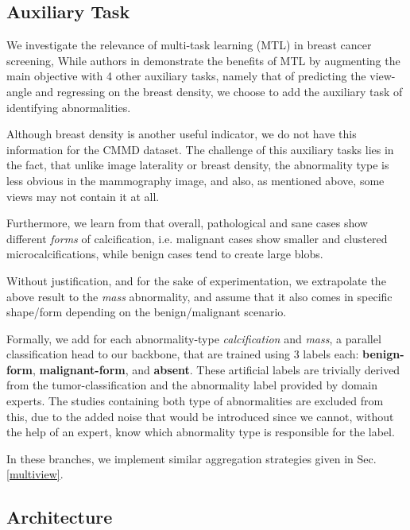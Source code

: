 \documentclass[11pt]{article}
\begin{document}
\subsection{Auxiliary Task}
\label{sec:org74e4ee0}

We investigate the relevance of multi-task learning (MTL) in breast cancer screening,
While authors in \autocite{tardy22} demonstrate the benefits of MTL
by augmenting the main objective with
4 other auxiliary tasks, namely that of predicting the view-angle and
regressing on the breast density,
we choose to add the auxiliary task of identifying abnormalities.

Although breast density is another useful indicator, we do not have this information for the CMMD dataset. The challenge of this auxiliary tasks lies in the fact, that unlike image laterality or breast density, the abnormality type is less obvious in the mammography image, and also, as mentioned above, some views may not contain it at all.

Furthermore, we learn from \autocite{azam21} that overall, pathological and sane
cases show different \emph{forms} of calcification, i.e. malignant cases show smaller and clustered
microcalcifications, while benign cases tend to create large blobs.

Without justification, and for the sake of experimentation,
we extrapolate the above result to the \emph{mass} abnormality, and assume
that it also comes in specific shape/form depending on the benign/malignant
scenario.

Formally, we add for each abnormality-type \emph{calcification} and \emph{mass},
a parallel classification head to our backbone, that are trained using
3 labels each: \textbf{benign-form}, \textbf{malignant-form}, and \textbf{absent}.
These artificial labels are trivially derived from the tumor-classification and
the abnormality label provided by domain experts.
The studies containing both type of abnormalities are excluded from this, due to the added noise that would be introduced since we cannot, without the help of an expert, know which abnormality type is responsible for the label.

In these branches, we implement similar aggregation strategies
given in Sec. \ref{multiview}.

\subsection{Architecture}
\label{sec:org81206e9}
\end{document}
